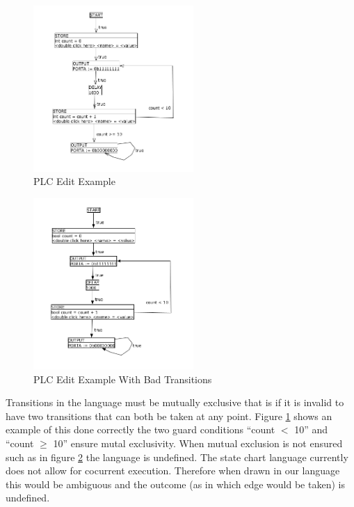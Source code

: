 \begin{figure}[htp]
    \centering
    \includegraphics[width=230px]{./images/tool_transition_example.png}
    \caption{PLC Edit Example}
    \label{fig:tool_transition_example}
\end{figure}

\begin{figure}[htp]
    \centering
    \includegraphics[width=230px]{./images/tool_transition_example_bad.png}
    \caption{PLC Edit Example With Bad Transitions}
    \label{fig:tool_transition_example_bad}
\end{figure}

Transitions in the language must be mutually exclusive that is if it is invalid to have two transitions that can both be taken at any point. Figure \ref{fig:tool_transition_example} shows an example of this done correctly the two guard conditions ``count $<$ 10'' and ``count $\geq$ 10'' ensure mutal exclusivity. When mutual exclusion is not ensured such as in figure \ref{fig:tool_transition_example_bad} the language is undefined. The state chart language currently does not allow for cocurrent execution. Therefore when drawn in our language this would be ambiguous and the outcome (as in which edge would be taken) is undefined.